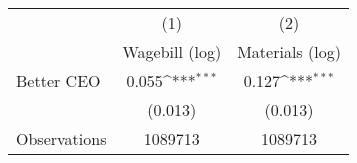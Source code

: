 {
\def\sym#1{\ifmmode^{#1}\else\(^{#1}\)\fi}
\begin{tabular}{l*{2}{c}}
\hline\hline
                    &\multicolumn{1}{c}{(1)}&\multicolumn{1}{c}{(2)}\\
                    &\multicolumn{1}{c}{Wagebill (log)}&\multicolumn{1}{c}{Materials (log)}\\
\hline
Better CEO          &       0.055\sym{***}&       0.127\sym{***}\\
                    &     (0.013)         &     (0.013)         \\
\hline
Observations        &     1089713         &     1089713         \\
\hline\hline
\end{tabular}
}
